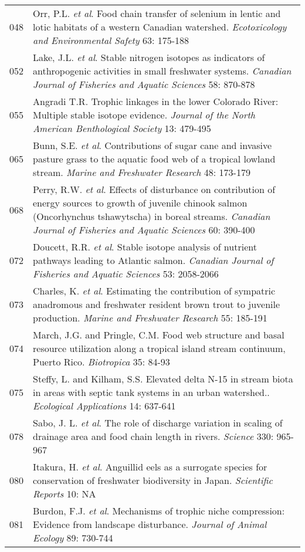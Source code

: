 \begin{longtable}{p{}p{}}
  048 & Orr, P.L. \textit{et al}. Food chain transfer of selenium in lentic and lotic habitats of a western Canadian watershed. \textit{Ecotoxicology and Environmental Safety} 63: 175-188 \\ 
  052 & Lake, J.L. \textit{et al}. Stable nitrogen isotopes as indicators of anthropogenic activities in small freshwater systems. \textit{Canadian Journal of Fisheries and Aquatic Sciences} 58: 870-878 \\ 
  055 & Angradi T.R. Trophic linkages in the lower Colorado River: Multiple stable isotope evidence. \textit{Journal of the North American Benthological Society} 13: 479-495 \\ 
  065 & Bunn, S.E. \textit{et al}. Contributions of sugar cane and invasive pasture grass to the aquatic food web of a tropical lowland stream. \textit{Marine and Freshwater Research} 48: 173-179 \\ 
  068 & Perry, R.W. \textit{et al}. Effects of disturbance on contribution of energy sources to growth of juvenile chinook salmon (Oncorhynchus tshawytscha) in boreal streams. \textit{Canadian Journal of Fisheries and Aquatic Sciences} 60: 390-400 \\ 
  072 & Doucett, R.R. \textit{et al}. Stable isotope analysis of nutrient pathways leading to Atlantic salmon. \textit{Canadian Journal of Fisheries and Aquatic Sciences} 53: 2058-2066 \\ 
  073 & Charles, K. \textit{et al}. Estimating the contribution of sympatric anadromous and freshwater resident brown trout to juvenile production. \textit{Marine and Freshwater Research} 55: 185-191 \\ 
  074 & March, J.G. and Pringle, C.M. Food web structure and basal resource utilization along a tropical island stream continuum, Puerto Rico. \textit{Biotropica} 35: 84-93 \\ 
  075 & Steffy, L. and Kilham, S.S. Elevated delta N-15 in stream biota in areas with septic tank systems in an urban watershed.. \textit{Ecological Applications} 14: 637-641 \\ 
  078 & Sabo, J. L. \textit{et al}. The role of discharge variation in scaling of drainage area and food chain length in rivers. \textit{Science} 330: 965-967 \\ 
  080 & Itakura, H. \textit{et al}. Anguillid eels as a surrogate species for conservation of freshwater biodiversity in Japan. \textit{Scientific Reports} 10: NA \\ 
  081 & Burdon, F.J. \textit{et al}. Mechanisms of trophic niche compression: Evidence from landscape disturbance. \textit{Journal of Animal Ecology} 89: 730-744 \\ 

\end{longtable}
